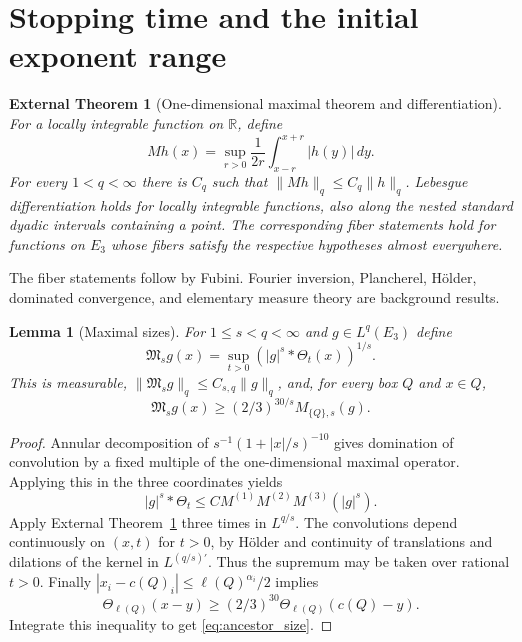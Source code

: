 \documentclass[12pt,reqno]{amsart}
\theoremstyle{plain}
\newtheorem{lemma}[theorem]{Lemma}
\newtheorem{exttheorem}[theorem]{External Theorem}
\theoremstyle{definition}
\theoremstyle{remark}
\numberwithin{equation}{section}
\newcommand{\R}{\mathbb R}
\newcommand{\dd}{\,d}
\begin{document}
\section{Stopping time and the initial exponent range}

\begin{exttheorem}[One-dimensional maximal theorem and differentiation]
\label{ext:maximal}
For a locally integrable function on $\R$, define
\[
 Mh(x)=\sup_{r>0}\frac1{2r}\int_{x-r}^{x+r}|h(y)|\dd y.
\]
For every $1<q<\infty$ there is $C_q$ such that
$\|Mh\|_q\le C_q\|h\|_q$. Lebesgue differentiation holds for
locally integrable functions, also along the nested standard dyadic
intervals containing a point. The corresponding fiber statements hold
for functions on $E_3$ whose fibers satisfy the respective hypotheses
almost everywhere.
\end{exttheorem}
The fiber statements follow by Fubini. Fourier inversion, Plancherel,
H\"older, dominated convergence, and elementary measure theory are
background results.

\begin{lemma}[Maximal sizes]\label{lem:maximal_size}
For $1\le s<q<\infty$ and $g\in L^q(E_3)$ define
\[
 \mathfrak M_sg(x)=\sup_{t>0}(|g|^s*\Theta_t(x))^{1/s}.
\]
This is measurable, $\|\mathfrak M_sg\|_q\le C_{s,q}\|g\|_q$,
and, for every box $Q$ and $x\in Q$,
\begin{equation}\label{eq:ancestor_size}
 \mathfrak M_sg(x)\ge(2/3)^{30/s}M_{\{Q\},s}(g).
\end{equation}
\end{lemma}
\begin{proof}
Annular decomposition of $s^{-1}(1+|x|/s)^{-10}$ gives domination
of convolution by a fixed multiple of the one-dimensional maximal
operator. Applying this in the three coordinates yields
\[
 |g|^s*\Theta_t\le C M^{(1)}M^{(2)}M^{(3)}(|g|^s).
\]
Apply External Theorem~\ref{ext:maximal} three times in $L^{q/s}$.
The convolutions depend continuously on $(x,t)$ for $t>0$, by
H\"older and continuity of translations and dilations of the kernel
in $L^{(q/s)'}$. Thus the supremum may be taken over rational $t>0$.
Finally $|x_i-c(Q)_i|\le\ell(Q)^{\alpha_i}/2$ implies
\[
 \Theta_{\ell(Q)}(x-y)\ge(2/3)^{30}
                      \Theta_{\ell(Q)}(c(Q)-y).
\]
Integrate this inequality to get \eqref{eq:ancestor_size}.
\end{proof}
\end{document}
